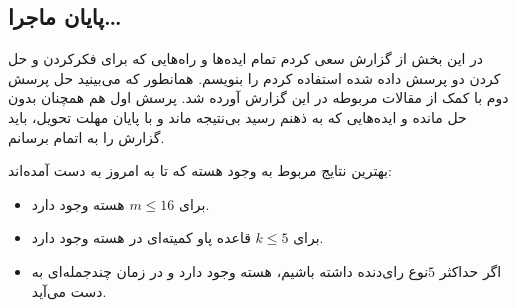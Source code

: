 \documentclass[12pt]{article}
\begin{document}
\subsection{پایان ماجرا\dots}
در این بخش از گزارش سعی کردم تمام ایده‌ها و راه‌هایی که برای فکرکردن و حل کردن
دو پرسش داده شده استفاده کردم را بنویسم. همانطور که می‌بینید حل پرسش دوم با کمک
از مقالات مربوطه در این گزارش آورده شد. پرسش اول هم همچنان بدون حل مانده و ایده‌هایی
که به ذهنم رسید بی‌نتیجه ماند
و با پایان مهلت تحویل، باید گزارش را به اتمام برسانم.

بهترین نتایج مربوط به وجود هسته که تا به امروز
به دست آمده‌اند:

\begin{itemize}
    \item برای $m \le 16$ هسته وجود دارد.
    \item برای $k \le 5$ قاعده پاو کمیته‌ای در هسته وجود دارد.
    \item اگر حداکثر $5$نوع رای‌دنده داشته باشیم، هسته وجود دارد و در زمان چندجمله‌ای به دست می‌آید.
\end{itemize}
\end{document}
